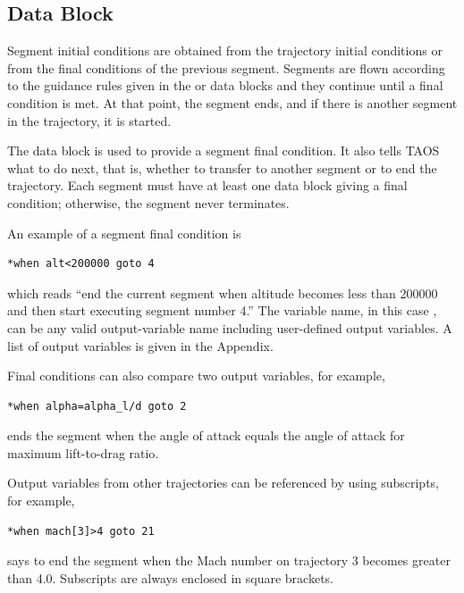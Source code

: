 \subsection{ Data Block}\label{sec:block-when}

Segment initial conditions are obtained from the trajectory initial conditions or from
the final conditions of the previous segment. Segments are flown according to the
guidance rules given in the  or  data
blocks and they continue until a final condition is met. At that point, the segment
ends, and if there is another segment in the trajectory, it is started.

The  data block is used to provide a segment final condition.
It also tells TAOS what to do next, that is, whether to transfer to another segment or
to end the trajectory. Each segment must have at least one
 data block giving a final condition; otherwise, the segment
never terminates.

An example of a segment final condition is

\begin{lstlisting}[style=taosmanual]
*when alt<200000 goto 4
\end{lstlisting}

which reads ``end the current segment when altitude becomes less than
\SI{200000}{\foot} and then start executing segment number 4.'' The variable name,
in this case , can be any valid output-variable name including
user-defined output variables. A list of output variables is given in the Appendix.

Final conditions can also compare two output variables, for example,

\begin{lstlisting}[style=taosmanual]
*when alpha=alpha_l/d goto 2
\end{lstlisting}

ends the segment when the angle of attack equals the angle of attack for maximum
lift-to-drag ratio.


Output variables from other trajectories can be referenced by using subscripts, for
example,

\begin{lstlisting}[style=taosmanual]
*when mach[3]>4 goto 21
\end{lstlisting}

says to end the segment when the Mach number on trajectory 3 becomes greater
than 4.0. Subscripts are always enclosed in square brackets.

